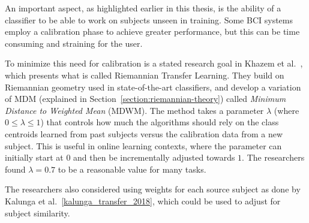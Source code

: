 An important aspect, as highlighted earlier in this thesis, is the ability of a classifier to be able to work on subjects unseen in training. Some BCI systems employ a calibration phase to achieve greater performance, but this can be time consuming and straining for the user. 

To minimize this need for calibration is a stated research goal in Khazem et al.~\cite{khazem_minimizing_2021}, which presents what is called Riemannian Transfer Learning. They build on Riemannian geometry used in state-of-the-art classifiers, and develop a variation of MDM (explained in Section~\ref{section:riemannian-theory}) called \emph{Minimum Distance to Weighted Mean} (MDWM). The method takes a parameter $\lambda$ (where $0 \leq \lambda \leq 1$) that controls how much the algorithms should rely on the class centroids learned from past subjects versus the calibration data from a new subject. This is useful in online learning contexts, where the parameter can initially start at $0$ and then be incrementally adjusted towards $1$. The researchers found $\lambda = 0.7$ to be a reasonable value for many tasks. 

The researchers also considered using weights for each source subject as done by Kalunga et al.~\ref{kalunga_transfer_2018}, which could be used to adjust for subject similarity.

